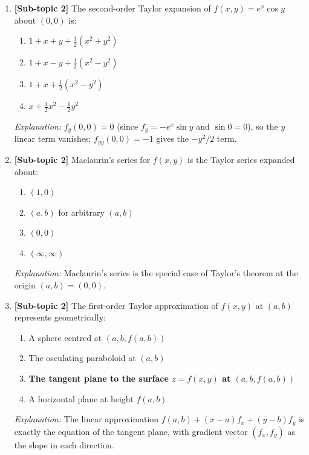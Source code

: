 \documentclass[12pt,a4paper]{article}
\begin{document}
\begin{enumerate}[leftmargin=*, label=\textbf{MCQ\arabic*.}]
  \item \textbf{[Sub-topic 2]} The second-order Taylor expansion of \( f(x,y) = e^{x}\cos y \) about \( (0,0) \) is:
  \begin{enumerate}[label=(\Alph*)]
    \item \( 1 + x + y + \tfrac{1}{2}(x^{2}+y^{2}) \)
    \item \( 1 + x - y + \tfrac{1}{2}(x^{2}-y^{2}) \)
    \item \textbf{\( 1 + x + \tfrac{1}{2}(x^{2}-y^{2}) \)}
    \item \( x + \tfrac{1}{2}x^{2} - \tfrac{1}{2}y^{2} \)
  \end{enumerate}
  \textit{Explanation:} \( f_y(0,0) = 0 \) (since \( f_y = -e^x\sin y \) and \( \sin 0 = 0 \)), so the \( y \) linear term vanishes; \( f_{yy}(0,0) = -1 \) gives the \( -y^{2}/2 \) term.

  \item \textbf{[Sub-topic 2]} Maclaurin's series for \( f(x,y) \) is the Taylor series expanded about:
  \begin{enumerate}[label=(\Alph*)]
    \item \( (1,0) \)
    \item \( (a,b) \) for arbitrary \( (a,b) \)
    \item \textbf{\( (0,0) \)}
    \item \( (\infty,\infty) \)
  \end{enumerate}
  \textit{Explanation:} Maclaurin's series is the special case of Taylor's theorem at the origin \( (a,b)=(0,0) \).

  \item \textbf{[Sub-topic 2]} The first-order Taylor approximation of \( f(x,y) \) at \( (a,b) \) represents geometrically:
  \begin{enumerate}[label=(\Alph*)]
    \item A sphere centred at \( (a,b,f(a,b)) \)
    \item The osculating paraboloid at \( (a,b) \)
    \item \textbf{The tangent plane to the surface \( z = f(x,y) \) at \( (a,b,f(a,b)) \)}
    \item A horizontal plane at height \( f(a,b) \)
  \end{enumerate}
  \textit{Explanation:} The linear approximation \( f(a,b)+(x-a)f_x+(y-b)f_y \) is exactly the equation of the tangent plane, with gradient vector \( (f_x, f_y) \) as the slope in each direction.

\end{enumerate}
\end{document}
